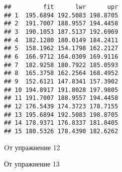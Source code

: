 \documentclass[
]{article}
\newenvironment{Shaded}{\begin{snugshade}}{\end{snugshade}}
\newcommand{\AttributeTok}[1]{\textcolor[rgb]{0.77,0.63,0.00}{#1}}
\newcommand{\CommentTok}[1]{\textcolor[rgb]{0.56,0.35,0.01}{\textit{#1}}}
\newcommand{\DecValTok}[1]{\textcolor[rgb]{0.00,0.00,0.81}{#1}}
\newcommand{\FunctionTok}[1]{\textcolor[rgb]{0.00,0.00,0.00}{#1}}
\newcommand{\NormalTok}[1]{#1}
\newcommand{\OtherTok}[1]{\textcolor[rgb]{0.56,0.35,0.01}{#1}}
\newcommand{\SpecialCharTok}[1]{\textcolor[rgb]{0.00,0.00,0.00}{#1}}
\begin{document}
\begin{verbatim}
##         fit      lwr      upr
## 1  195.6894 192.5083 198.8705
## 2  191.7007 188.9557 194.4458
## 3  190.1053 187.5137 192.6969
## 4  182.1280 180.0149 184.2411
## 5  158.1962 154.1798 162.2127
## 6  166.9712 164.0309 169.9116
## 7  182.9258 180.7922 185.0593
## 8  165.3758 162.2564 168.4952
## 9  152.6121 147.8341 157.3902
## 10 194.8917 191.8028 197.9805
## 11 191.7007 188.9557 194.4458
## 12 176.5439 174.3723 178.7155
## 13 195.6894 192.5083 198.8705
## 14 178.9371 176.8337 181.0405
## 15 180.5326 178.4390 182.6262
\end{verbatim}

Oт упражнение 12

От упражнение 13

\begin{Shaded}
\end{Shaded}
\end{document}
